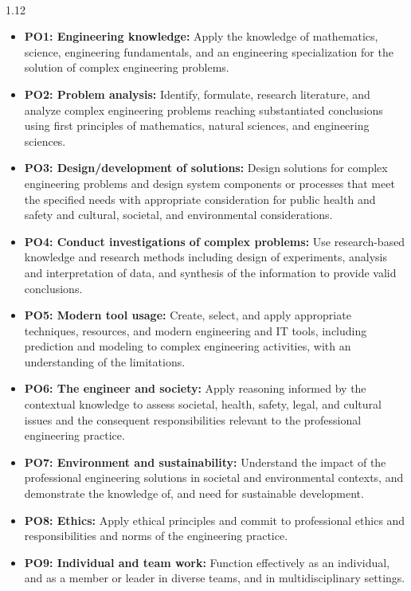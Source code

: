 \\
\begin{spacing}{1.12}
{\small
\begin{itemize}
    \item \textbf{PO1: Engineering knowledge:} Apply the knowledge of mathematics, science, engineering fundamentals, and an engineering specialization for the solution of complex engineering problems.
    \item \textbf{PO2: Problem analysis:} Identify, formulate, research literature, and analyze complex engineering problems reaching substantiated conclusions using first principles of mathematics, natural sciences, and engineering sciences.
    \item \textbf{PO3: Design/development of solutions:} Design solutions for complex engineering problems and design system components or processes that meet the specified needs with appropriate consideration for public health and safety and cultural, societal, and environmental considerations.
    \item \textbf{PO4: Conduct investigations of complex problems:} Use research-based knowledge and research methods including design of experiments, analysis and interpretation of data, and synthesis of the information to provide valid conclusions.
    \item \textbf{PO5: Modern tool usage:} Create, select, and apply appropriate techniques, resources, and modern engineering and IT tools, including prediction and modeling to complex engineering activities, with an understanding of the limitations.
    \item \textbf{PO6: The engineer and society:} Apply reasoning informed by the contextual knowledge to assess societal, health, safety, legal, and cultural issues and the consequent responsibilities relevant to the professional engineering practice.
    \item \textbf{PO7: Environment and sustainability:} Understand the impact of the professional engineering solutions in societal and environmental contexts, and demonstrate the knowledge of, and need for sustainable development.
    \item \textbf{PO8: Ethics:} Apply ethical principles and commit to professional ethics and responsibilities and norms of the engineering practice.
    \item \textbf{PO9: Individual and team work:} Function effectively as an individual, and as a member or leader in diverse teams, and in multidisciplinary settings.

\end{itemize}}
\end{spacing}
